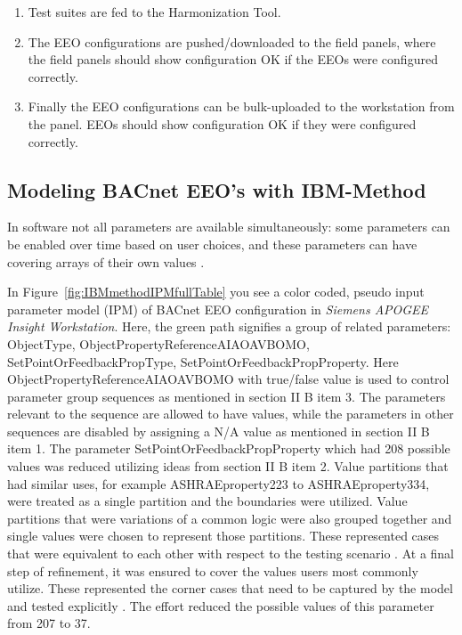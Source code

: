\documentclass[conference]{IEEEtran}
\begin{document}
	\begin{enumerate}
		\item Test suites are fed to the Harmonization Tool. 
		\item The EEO configurations are pushed/downloaded to the field panels, where the field
		panels should show configuration OK if the EEOs were configured correctly. 		
		\item Finally the EEO configurations can be bulk-uploaded to the workstation from the panel.
		EEOs should show configuration OK if they were configured correctly. 
	\end{enumerate}


	\subsection{Modeling BACnet EEO's with IBM-Method}
  In software not all parameters are available simultaneously:
	some parameters can be enabled over time based on user choices,
	and these parameters can have covering arrays of their own values \cite{kuhn2008practical}. 
	
	In Figure~\ref{fig:IBMmethodIPMfullTable} you see a color coded, pseudo input parameter model (IPM) of BACnet EEO configuration in
	\textit{Siemens APOGEE Insight Workstation}. Here, the green path signifies
	a group of related parameters: ObjectType, ObjectPropertyReferenceAIAOAVBOMO,
	SetPointOrFeedbackPropType, SetPointOrFeedbackPropProperty.
	Here ObjectPropertyReferenceAIAOAVBOMO with true/false value is used
	to control parameter group sequences as mentioned in section II B item 3.
	The parameters relevant to the sequence are allowed to have values, 
	while the parameters in other sequences are disabled by assigning 
	a N/A value as mentioned in section II B item 1.
	The parameter SetPointOrFeedbackPropProperty
	which had 208 possible values was reduced utilizing ideas from section II B item 2.
	Value partitions that had similar uses, for example ASHRAEproperty223 to ASHRAEproperty334, were treated as a single partition and the boundaries were utilized.
	Value partitions that were variations of a common logic were also grouped together and single values were chosen to represent those partitions.
	These represented cases that were equivalent to each other with respect to the testing scenario \cite{segall2012common}.
	At a final step of refinement, it was ensured to cover the values users most commonly utilize.
  These represented the corner cases that need to be captured by the model and tested explicitly \cite{segall2012common}.
	The effort reduced the possible values of this parameter from 207 to 37.
\end{document}
